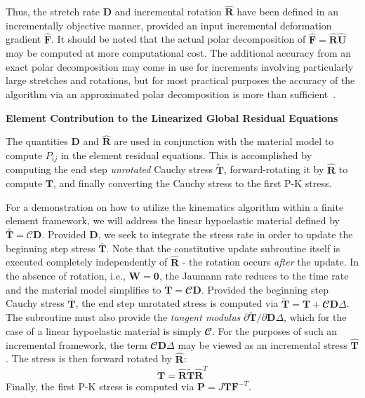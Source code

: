 Thus, the stretch rate $\bm{D}$ and incremental rotation $\hat{\bm{R}}$ have been defined in an incrementally objective manner, provided an input incremental deformation gradient $\hat{\bm{F}}$.  It should be noted that the actual polar decomposition of $\hat{\bm{F}} = \hat{\bm{R}}\hat{\bm{U}}$ may be computed at more computational cost. The additional accuracy from an exact polar decomposition may come in use for increments involving particularly large stretches and rotations, but for most practical purposes the accuracy of the algorithm via an approximated polar decomposition is more than sufficient~\cite{rashid_1993}.

\textbf{Element Contribution to the Linearized Global Residual Equations}

The quantities $\bm{D}$ and $\hat{\bm{R}}$ are used in conjunction with the material model to compute $P_{ij}$ in the element residual equations. This is accomplished by computing the end step \textit{unrotated} Cauchy stress $\tilde{\bm{T}}$, forward-rotating it by $\hat{\bm{R}}$ to compute $\bm{T}$, and finally converting the Cauchy stress to the first P-K stress.

For a demonstration on how to utilize the kinematics algorithm within a finite element framework, we will address the linear hypoelastic material defined by $\overset{\circ}{\bm{T}} = \bm{\mathcal{C}}\bm{D}$. Provided $\bm{D}$, we seek to integrate the stress rate in order to update the beginning step stress $\overline{\bm{T}}$. Note that the constitutive update subroutine itself is executed completely independently of $\hat{\bm{R}}$ - the rotation occurs \textit{after} the update. In the absence of rotation, i.e., $\bm{W} = \bm{0}$, the Jaumann rate reduces to the time rate and the material model simplifies to $\dot{\bm{T}} = \mathbfcal{C}\bm{D}$. Provided the beginning step Cauchy stress $\overline{\bm{T}}$, the end step unrotated stress is computed via $\tilde{\bm{T}} = \overline{\bm{T}} + \mathbfcal{C}\bm{D}\Delta$. The subroutine must also provide the \textit{tangent modulus} $\partial\tilde{\bm{T}}/\partial{\bm{D}\Delta}$, which for the case of a linear hypoelastic material is simply $\mathbfcal{C}$. For the purposes of such an incremental framework, the term $\mathbfcal{C}\bm{D}\Delta$ may be viewed as an incremental stress $\hat{\bm{T}}$. The stress is then forward rotated by $\hat{\bm{R}}$:
\begin{equation}
\bm{T} = \hat{\bm{R}}\tilde{\bm{T}}\hat{\bm{R}}^T
\end{equation}
Finally, the first P-K stress is computed via $\bm{P} = J\bm{T}\bm{F}^{-T}$.

